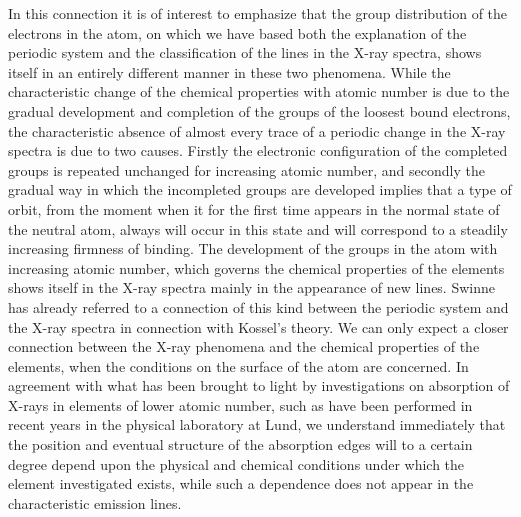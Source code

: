  In this connection it is
of interest to emphasize that the group distribution of the electrons
in the atom, on which we have based both the explanation of the
periodic system and the classification of the lines in the X-ray
spectra, shows itself in an entirely different manner in these two
phenomena. While the characteristic change of the chemical
properties with atomic number is due to the gradual development
and completion of the groups of the loosest bound electrons, the
characteristic absence of almost every trace of a periodic change in
the X-ray spectra is due to two causes. Firstly the electronic
configuration of the completed groups is repeated unchanged for
increasing atomic number, and secondly the gradual way in which
the incompleted groups are developed implies that a type of orbit,
from the moment when it for the first time appears in the normal
state of the neutral atom, always will occur in this state and will
correspond to a steadily increasing firmness of binding. The development
of the groups in the atom with increasing atomic number,
which governs the chemical properties of the elements shows itself
in the X-ray spectra mainly in the appearance of new lines. Swinne
has already referred to a connection of this kind between the periodic
system and the X-ray spectra in connection with Kossel's theory.
We can only expect a closer connection between the X-ray phenomena
and the chemical properties of the elements, when the conditions
on the surface of the atom are concerned. In agreement
with what has been brought to light by investigations on absorption
of X-rays in elements of lower atomic number, such as have
been performed in recent years in the physical laboratory at Lund,
we understand immediately that the position and eventual structure
of the absorption edges will to a certain degree depend upon
the physical and chemical conditions under which the element
investigated exists, while such a dependence does not appear in
the characteristic emission lines.

